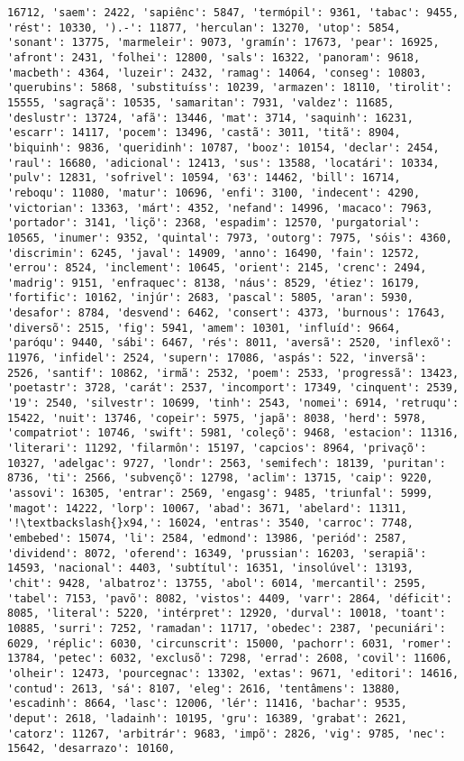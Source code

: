 \begin{Verbatim}[commandchars=\\\{\}]
16712, 'saem': 2422, 'sapiênc': 5847, 'termópil': 9361, 'tabac': 9455, 'rést': 10330, ').-': 11877, 'herculan': 13270, 'utop': 5854, 'sonant': 13775, 'marmeleir': 9073, 'gramín': 17673, 'pear': 16925, 'afront': 2431, 'folhei': 12800, 'sals': 16322, 'panoram': 9618, 'macbeth': 4364, 'luzeir': 2432, 'ramag': 14064, 'conseg': 10803, 'querubins': 5868, 'substituíss': 10239, 'armazen': 18110, 'tirolit': 15555, 'sagraçã': 10535, 'samaritan': 7931, 'valdez': 11685, 'deslustr': 13724, 'afã': 13446, 'mat': 3714, 'saquinh': 16231, 'escarr': 14117, 'pocem': 13496, 'castã': 3011, 'titã': 8904, 'biquinh': 9836, 'queridinh': 10787, 'booz': 10154, 'declar': 2454, 'raul': 16680, 'adicional': 12413, 'sus': 13588, 'locatári': 10334, 'pulv': 12831, 'sofrivel': 10594, '63': 14462, 'bill': 16714, 'reboqu': 11080, 'matur': 10696, 'enfi': 3100, 'indecent': 4290, 'victorian': 13363, 'márt': 4352, 'nefand': 14996, 'macaco': 7963, 'portador': 3141, 'liçõ': 2368, 'espadim': 12570, 'purgatorial': 10565, 'inumer': 9352, 'quintal': 7973, 'outorg': 7975, 'sóis': 4360, 'discrimin': 6245, 'javal': 14909, 'anno': 16490, 'fain': 12572, 'errou': 8524, 'inclement': 10645, 'orient': 2145, 'crenc': 2494, 'madrig': 9151, 'enfraquec': 8138, 'náus': 8529, 'étiez': 16179, 'fortific': 10162, 'injúr': 2683, 'pascal': 5805, 'aran': 5930, 'desafor': 8784, 'desvend': 6462, 'consert': 4373, 'burnous': 17643, 'diversõ': 2515, 'fig': 5941, 'amem': 10301, 'influíd': 9664, 'paróqu': 9440, 'sábi': 6467, 'rés': 8011, 'aversã': 2520, 'inflexõ': 11976, 'infidel': 2524, 'supern': 17086, 'aspás': 522, 'inversã': 2526, 'santif': 10862, 'irmã': 2532, 'poem': 2533, 'progressã': 13423, 'poetastr': 3728, 'carát': 2537, 'incomport': 17349, 'cinquent': 2539, '19': 2540, 'silvestr': 10699, 'tinh': 2543, 'nomei': 6914, 'retruqu': 15422, 'nuit': 13746, 'copeir': 5975, 'japã': 8038, 'herd': 5978, 'compatriot': 10746, 'swift': 5981, 'coleçõ': 9468, 'estacion': 11316, 'literari': 11292, 'filarmôn': 15197, 'capcios': 8964, 'privaçõ': 10327, 'adelgac': 9727, 'londr': 2563, 'semifech': 18139, 'puritan': 8736, 'ti': 2566, 'subvençõ': 12798, 'aclim': 13715, 'caip': 9220, 'assovi': 16305, 'entrar': 2569, 'engasg': 9485, 'triunfal': 5999, 'magot': 14222, 'lorp': 10067, 'abad': 3671, 'abelard': 11311, '!\textbackslash{}x94,': 16024, 'entras': 3540, 'carroc': 7748, 'embebed': 15074, 'li': 2584, 'edmond': 13986, 'periód': 2587, 'dividend': 8072, 'oferend': 16349, 'prussian': 16203, 'serapiã': 14593, 'nacional': 4403, 'subtítul': 16351, 'insolúvel': 13193, 'chit': 9428, 'albatroz': 13755, 'abol': 6014, 'mercantil': 2595, 'tabel': 7153, 'pavõ': 8082, 'vistos': 4409, 'varr': 2864, 'déficit': 8085, 'literal': 5220, 'intérpret': 12920, 'durval': 10018, 'toant': 10885, 'surri': 7252, 'ramadan': 11717, 'obedec': 2387, 'pecuniári': 6029, 'réplic': 6030, 'circunscrit': 15000, 'pachorr': 6031, 'romer': 13784, 'petec': 6032, 'exclusõ': 7298, 'errad': 2608, 'covil': 11606, 'olheir': 12473, 'pourcegnac': 13302, 'extas': 9671, 'editori': 14616, 'contud': 2613, 'sá': 8107, 'eleg': 2616, 'tentâmens': 13880, 'escadinh': 8664, 'lasc': 12006, 'lér': 11416, 'bachar': 9535, 'deput': 2618, 'ladainh': 10195, 'gru': 16389, 'grabat': 2621, 'catorz': 11267, 'arbitrár': 9683, 'impõ': 2826, 'vig': 9785, 'nec': 15642, 'desarrazo': 10160, 
\end{Verbatim}

